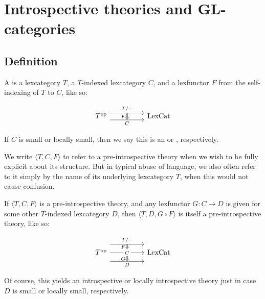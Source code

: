 \section{Introspective theories and GL-categories}

\subsection{Definition}
\begin{definition}
A  is a lexcategory $T$, a $T$-indexed lexcategory $C$, and a lexfunctor $F$ from the self-indexing of $T$ to $C$, like so:

\[\begin{tikzcd}
	{\op{T}} && {\LexCat}
	\arrow["{T/-}"{name=0}, from=1-1, to=1-3, shift left=2]
	\arrow["{C}"{name=1, swap}, from=1-1, to=1-3, shift right=2]
	\arrow[Rightarrow, "{F}"', from=0, to=1]
\end{tikzcd}\]

If $C$ is small or locally small, then we say this is an  or , respectively.
\end{definition}

We write $\langle T, C, F \rangle$ to refer to a pre-introspective theory when we wish to be fully explicit about its structure. But in typical abuse of language, we also often refer to it simply by the name of its underlying lexcategory $T$, when this would not cause confusion.

\begin{construction}
If $\langle T, C, F \rangle$ is a pre-introspective theory, and any lexfunctor $G : C \to D$ is given for some other $T$-indexed lexcategory $D$, then $\langle T, D, G \circ F \rangle$ is itself a pre-introspective theory, like so: 

\[\begin{tikzcd}
	{\op{T}} && {\LexCat}
	\arrow["{T/-}"{name=0}, from=1-1, to=1-3, shift left=5]
	\arrow["{C}"{name=1, description}, from=1-1, to=1-3]
	\arrow["{D}"{name=2, swap}, from=1-1, to=1-3, shift right=5]
	\arrow[Rightarrow, "{F}"', from=0, to=1]
	\arrow[Rightarrow, "{G}"', from=1, to=2]
\end{tikzcd}\]

Of course, this yields an introspective or locally introspective theory just in case $D$ is small or locally small, respectively.
\end{construction}

